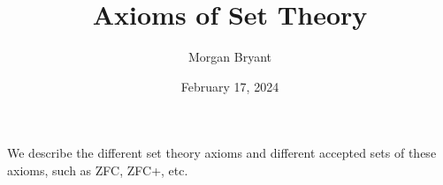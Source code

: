 \documentclass[a4paper]{article}
\title{Axioms of Set Theory}
\date{February 17, 2024}
\author{Morgan Bryant}
\begin{document}
\maketitle
\par{We describe the different set theory axioms and different accepted sets of these axioms, such as ZFC, ZFC+, etc.}
\printbibliography
\end{document}

